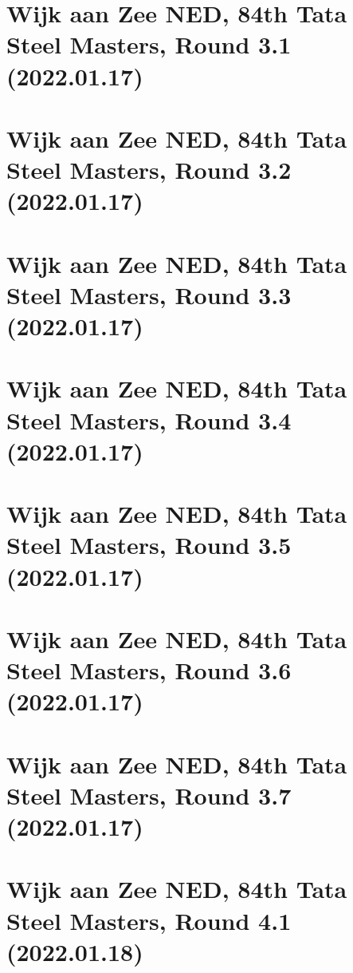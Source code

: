 \documentclass[11pt]{article}
\newcommand*\cleartoleftpage{%
   \clearpage
   \ifodd\value{page}\hbox{}\newpage\fi
}
\begin{document}
\cleartoleftpage

\section{Wijk aan Zee NED, 84th Tata Steel Masters, Round 3.1 (2022.01.17)}


\cleartoleftpage

\section{Wijk aan Zee NED, 84th Tata Steel Masters, Round 3.2 (2022.01.17)}


\cleartoleftpage

\section{Wijk aan Zee NED, 84th Tata Steel Masters, Round 3.3 (2022.01.17)}


\cleartoleftpage

\section{Wijk aan Zee NED, 84th Tata Steel Masters, Round 3.4 (2022.01.17)}


\cleartoleftpage

\section{Wijk aan Zee NED, 84th Tata Steel Masters, Round 3.5 (2022.01.17)}


\cleartoleftpage

\section{Wijk aan Zee NED, 84th Tata Steel Masters, Round 3.6 (2022.01.17)}


\cleartoleftpage

\section{Wijk aan Zee NED, 84th Tata Steel Masters, Round 3.7 (2022.01.17)}


\cleartoleftpage

\section{Wijk aan Zee NED, 84th Tata Steel Masters, Round 4.1 (2022.01.18)}

\end{document}
